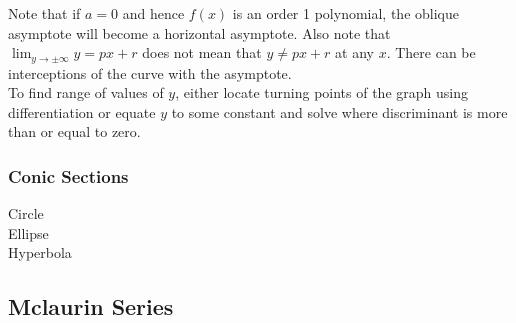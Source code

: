 \documentclass[../main]{subfiles}
\begin{document}
	Note that if \(a=0\) and hence \(f(x)\) is an order 1 polynomial, the oblique asymptote will become a horizontal asymptote. Also note that \(\lim_{y\to\pm\infty} y = px+r\) does not mean that \(y \neq px + r\) at any \(x\). There can be interceptions of the curve with the asymptote. \\

	To find range of values of \(y\), either locate turning points of the graph using differentiation or equate \(y\) to some constant and solve where discriminant is more than or equal to zero.

	\subsubsection{Conic Sections}

	Circle \\

	Ellipse \\

	Hyperbola \\

\subsection{Mclaurin Series}
\end{document}
